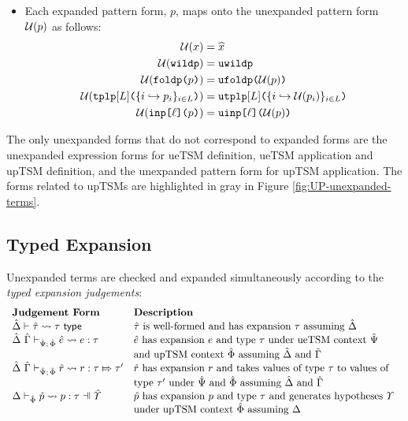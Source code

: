 {{{{\begin{itemize}
\begin{align*}
\end{align*}
\item Each expanded pattern form, $p$, maps onto the unexpanded pattern form $\mathcal{U}(p)$ as follows:
\begin{align*}
\mathcal{U}(x) & = \widehat{x}\\
\mathcal{U}(\texttt{wildp}) &= \texttt{uwildp}\\
\mathcal{U}(\texttt{foldp}\texttt{(}p\texttt{)}) &= \texttt{ufoldp}\texttt{(}\mathcal{U}(p)\texttt{)}\\
\mathcal{U}(\texttt{tplp}[L]\texttt{(}\{i \hookrightarrow p_{i}\}_{i \in L}\texttt{)}) & = \texttt{utplp}[L]\texttt{(}\{i \hookrightarrow \mathcal{U}(p_{i})\}_{i \in L}\texttt{)}\\
\mathcal{U}(\texttt{inp}\texttt{[}\ell\texttt{](}p\texttt{)}) & = \texttt{uinp}\texttt{[}\ell\texttt{](}\mathcal{U}(p)\texttt{)}
\end{align*}
\end{itemize}

The only unexpanded forms that do not correspond to expanded forms are the unexpanded expression forms for ueTSM definition, ueTSM application and upTSM definition, and the unexpanded pattern form for upTSM application. The forms related to upTSMs are highlighted in gray in Figure \ref{fig:UP-unexpanded-terms}.

\subsection{Typed Expansion}\label{sec:typed-expansion-UP}
Unexpanded terms are checked and expanded simultaneously according to the \emph{typed expansion judgements}:
\[\begin{array}{ll}
\textbf{Judgement Form} & \textbf{Description}\\
\expandsTU{\uDelta}{\utau}{\tau} & \text{$\utau$ is well-formed and has expansion $\tau$ assuming $\uDelta$}\\
\expandsUP{\uDelta}{\uGamma}{\uPsi}{\uPhi}{\ue}{e}{\tau} & \text{$\ue$ has expansion $e$ and type $\tau$ under ueTSM context $\uPsi$}\\
& \text{and upTSM context $\uPhi$ assuming $\uDelta$ and $\uGamma$}\\
\ruleExpands{\uDelta}{\uGamma}{\uPsi}{\uPhi}{\urv}{r}{\tau}{\tau'} & \text{$\urv$ has expansion $r$ and takes values of type $\tau$ to values of}\\
& \text{type $\tau'$ under $\uPsi$ and $\uPhi$ assuming $\uDelta$ and $\uGamma$}\\
\patExpands{\upctx}{\uPhi}{\upv}{p}{\tau} & \text{$\upv$ has expansion $p$ and type $\tau$ and generates hypotheses $\pctx$ }\\
& \text{under upTSM context $\uPhi$ assuming $\Delta$}
\end{array}\]

}}}}
